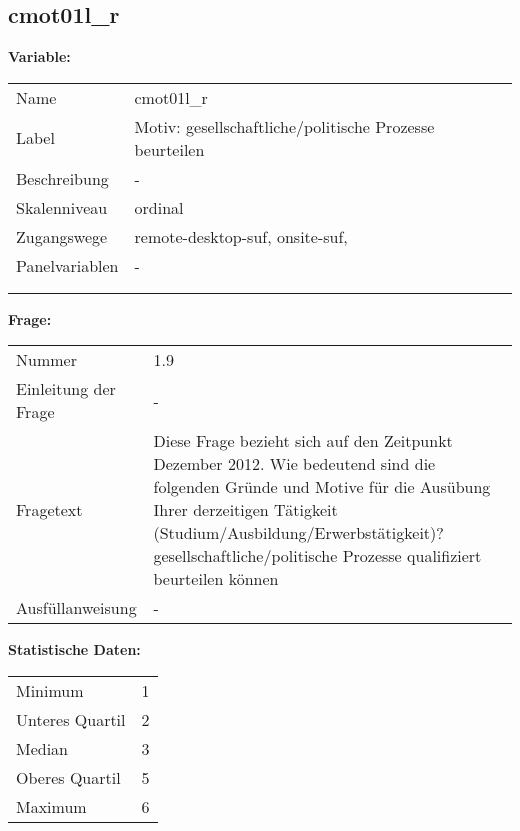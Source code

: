 	
	
	\subsection{cmot01l\_r}
	\label{subSection:cmot01l_r}

	\noindent\textbf{Variable:}\\
		\begin{tabular}{lL{11.3cm}}
			\label{tableVariable:cmot01l_r}
			Name & cmot01l\_r \\
			Label & Motiv: gesellschaftliche/politische Prozesse beurteilen \\
			Beschreibung & - \\
			Skalenniveau & ordinal \\
			Zugangswege &
				remote-desktop-suf,
				onsite-suf,
 \\
			Panelvariablen & -
			 \\
			 \\
 \\
		\end{tabular}

		\vspace*{1 cm}
		\noindent\textbf{Frage:}\\
		\begin{tabular}{lL{11.3cm}}
			\label{tableQuestion:cmot01l_r}
			Nummer & 1.9 \\
			Einleitung der Frage & - \\
			Fragetext & Diese Frage bezieht sich auf den Zeitpunkt Dezember 2012. Wie bedeutend sind die folgenden Gründe und Motive für die Ausübung Ihrer derzeitigen Tätigkeit (Studium/Ausbildung/Erwerbstätigkeit)?
gesellschaftliche/politische Prozesse qualifiziert beurteilen können \\
			Ausfüllanweisung & - \\
		\end{tabular}


		\vspace*{1 cm}
		\noindent\textbf{Statistische Daten:}\\
			\begin{tabular}{ll}
				\label{tableStatistics:cmot01l_r}
					Minimum & 1 \\
					Unteres Quartil & 2 \\
					Median & 3 \\
					Oberes Quartil & 5 \\
					Maximum & 6 \\
			\end{tabular}



